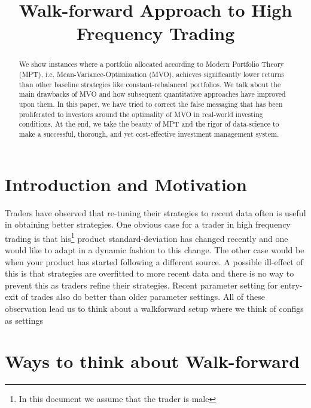 \documentclass[10pt,a4paper]{article}
\title{Walk-forward Approach to High Frequency Trading}
\begin{document}
	
\maketitle

\begin{abstract}
	We show instances where a portfolio allocated according to Modern Portfolio Theory (MPT), i.e. Mean-Variance-Optimization (MVO), achieves significantly lower returns than other baseline strategies like constant-rebalanced portfolios. We talk about the main drawbacks of MVO and how subsequent quantitative approaches have improved upon them. In this paper, we have tried to correct the false messaging that has been proliferated to investors around the optimality of MVO in real-world investing conditions. At the end, we take the beauty of MPT and the rigor of data-science to make a successful, thorough, and yet cost-effective investment management system.
\end{abstract}




\section{Introduction and Motivation}

Traders have observed that re-tuning their strategies to recent data often is useful in obtaining better strategies. One obvious case for a trader in high frequency trading is that his\footnote{In this document we assume that the trader is male} product standard-deviation has changed recently and one would like to adapt in a dynamic fashion to this change. The other case would be when your product has started following a different source. A possible ill-effect of this is that strategies are overfitted to more recent data and there is no way to prevent this as traders refine their strategies. Recent parameter setting for entry-exit of trades also do better than older parameter settings. All of these observation lead us to think about a walkforward setup where we think of configs as settings






\section{Ways to think about Walk-forward}
\end{document}
